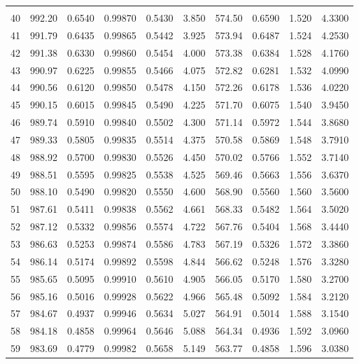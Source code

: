 \documentclass[letter,twosides,10pt]{article}
\begin{document}
\begin{longtable}{|c|c|c|c|c|c|c|c|c|c|}
 & & & & & & & & & \\ 
 40 & 992.20 & 0.6540 & 0.99870 & 0.5430 &  3.850 & 574.50 & 0.6590 & 1.520 &  4.3300 \\
 41 & 991.79 & 0.6435 & 0.99865 & 0.5442 &  3.925 & 573.94 & 0.6487 & 1.524 &  4.2530 \\
 42 & 991.38 & 0.6330 & 0.99860 & 0.5454 &  4.000 & 573.38 & 0.6384 & 1.528 &  4.1760 \\
 43 & 990.97 & 0.6225 & 0.99855 & 0.5466 &  4.075 & 572.82 & 0.6281 & 1.532 &  4.0990 \\
 44 & 990.56 & 0.6120 & 0.99850 & 0.5478 &  4.150 & 572.26 & 0.6178 & 1.536 &  4.0220 \\
 45 & 990.15 & 0.6015 & 0.99845 & 0.5490 &  4.225 & 571.70 & 0.6075 & 1.540 &  3.9450 \\
 46 & 989.74 & 0.5910 & 0.99840 & 0.5502 &  4.300 & 571.14 & 0.5972 & 1.544 &  3.8680 \\
 47 & 989.33 & 0.5805 & 0.99835 & 0.5514 &  4.375 & 570.58 & 0.5869 & 1.548 &  3.7910 \\
 48 & 988.92 & 0.5700 & 0.99830 & 0.5526 &  4.450 & 570.02 & 0.5766 & 1.552 &  3.7140 \\
 49 & 988.51 & 0.5595 & 0.99825 & 0.5538 &  4.525 & 569.46 & 0.5663 & 1.556 &  3.6370 \\
 50 & 988.10 & 0.5490 & 0.99820 & 0.5550 &  4.600 & 568.90 & 0.5560 & 1.560 &  3.5600 \\
 51 & 987.61 & 0.5411 & 0.99838 & 0.5562 &  4.661 & 568.33 & 0.5482 & 1.564 &  3.5020 \\
 52 & 987.12 & 0.5332 & 0.99856 & 0.5574 &  4.722 & 567.76 & 0.5404 & 1.568 &  3.4440 \\
 53 & 986.63 & 0.5253 & 0.99874 & 0.5586 &  4.783 & 567.19 & 0.5326 & 1.572 &  3.3860 \\
 54 & 986.14 & 0.5174 & 0.99892 & 0.5598 &  4.844 & 566.62 & 0.5248 & 1.576 &  3.3280 \\
 55 & 985.65 & 0.5095 & 0.99910 & 0.5610 &  4.905 & 566.05 & 0.5170 & 1.580 &  3.2700 \\
 56 & 985.16 & 0.5016 & 0.99928 & 0.5622 &  4.966 & 565.48 & 0.5092 & 1.584 &  3.2120 \\
 57 & 984.67 & 0.4937 & 0.99946 & 0.5634 &  5.027 & 564.91 & 0.5014 & 1.588 &  3.1540 \\
 58 & 984.18 & 0.4858 & 0.99964 & 0.5646 &  5.088 & 564.34 & 0.4936 & 1.592 &  3.0960 \\
 59 & 983.69 & 0.4779 & 0.99982 & 0.5658 &  5.149 & 563.77 & 0.4858 & 1.596 &  3.0380 \\

\end{longtable}
\end{document}
